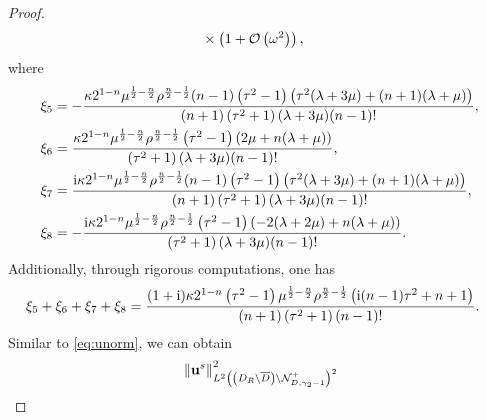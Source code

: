 \documentclass[10pt,a4paper]{amsart}
\newcommand{\bu}{\mathbf{u}}
\newcommand{\bx}{\mathbf{x}}
\begin{document}
\begin{proof}
\begin{align}
		&\times \left(1+\mathcal{O}\left(\omega^2\right)\right),\notag
	\end{align}
	where
	\begin{align}
		\xi _5&=-\frac{\kappa 2^{1-n} \mu ^{\frac{1}{2}-\frac{n}{2}} \rho ^{\frac{n}{2}-\frac{1}{2}} (n-1) \left(\tau ^2-1\right)  \left(\tau ^2 (\lambda +3 \mu )+(n+1) (\lambda +\mu )\right)}{(n+1) \left(\tau ^2+1\right) (\lambda +3 \mu )  (n-1)!},\notag\\
		\xi _6&=\frac{\kappa 2^{1-n} \mu ^{\frac{1}{2}-\frac{n}{2}} \rho ^{\frac{n}{2}-\frac{1}{2}} \left(\tau ^2-1\right) (2 \mu +n (\lambda +\mu ))}{\left(\tau ^2+1\right) (\lambda +3 \mu )  (n-1)!},\notag\\
		\xi _7&=\frac{\mathrm{i} \kappa 2^{1-n}\mu ^{\frac{1}{2}-\frac{n}{2}} \rho ^{\frac{n}{2}-\frac{1}{2}} (n-1) \left(\tau ^2-1\right)  \left(\tau ^2 (\lambda +3 \mu )+(n+1) (\lambda +\mu )\right)}{(n+1) \left(\tau ^2+1\right) (\lambda +3 \mu ) (n-1)!},\notag\\
		\xi _8&=-\frac{\mathrm{i}  \kappa 2^{1-n}\mu ^{\frac{1}{2}-\frac{n}{2}} \rho ^{\frac{n}{2}-\frac{1}{2}} \left(\tau ^2-1\right)  (-2 (\lambda +2 \mu )+n (\lambda +\mu ))}{\left(\tau ^2+1\right) (\lambda +3 \mu ) (n-1)!}.\notag
	\end{align}
	Additionally, through rigorous computations, one has
	\begin{align}
		\xi _5&+\xi _6+\xi _7+\xi _8=\frac{(1+\mathrm{i} ) \kappa 2^{1-n} \left(\tau ^2-1\right) \mu ^{\frac{1}{2}-\frac{n}{2}} \rho ^{\frac{n}{2}-\frac{1}{2}} \left(\mathrm{i}  (n-1) \tau ^2+n+1\right)}{(n+1) \left(\tau ^2+1\right)(n-1)!}.\notag
	\end{align}
	Similar to \eqref{eq:unorm}, we can obtain
	\begin{align}
		&\left\|\bu^{s}\right\|_{L^{2}\left(\left(D_R \setminus \overline{D}\right) \setminus \mathcal{N}_{D,\gamma_{2}-1}^{+}\right)^{2}}^{2}\notag\\

\end{align}
\end{proof}
\end{document}
